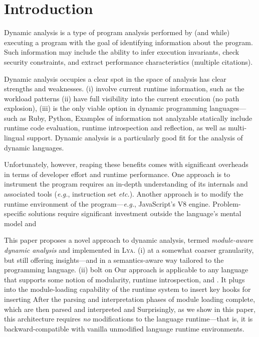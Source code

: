 \documentclass[letterpaper,twocolumn,10pt]{article}
\def\eg{{\em e.g.}, }
\def\etc{{\em etc.}\xspace}
\newcommand{\sys}{{\scshape Lya}\xspace}
\begin{document}
\section{Introduction}
\label{intro}

Dynamic analysis is a type of program analysis performed by (and while) executing a program with the goal of identifying information about the program.
Such information may include the ability to infer execution invariants, check security constraints, and extract performance characteristics (multiple citations).

Dynamic analysis occupies a clear spot in the space of analysis has clear strengths and weaknesses.
  (i) involve current runtime information, such as the workload patterns
  (ii) have full visibility into the current execution (no path explosion),
  (iii) is the only viable option in dynamic programming languages---such as Ruby, Python, 
Examples of information not analyzable statically include runtime code evaluation, runtime introspection and reflection, as well as multi-lingual support.
Dynamic analysis is a particularly good fit for the analysis of dynamic languages.

Unfortunately, however, reaping these benefits comes with significant overheads in terms of developer effort and runtime performance.
One approach is to instrument the program requires an in-depth understanding of its internals and associated tools (\eg instruction set \etc).
Another approach is to modify the runtime environment of the program---\eg JavaScript's V8 engine.
Problem-specific solutions require significant investment outside the language's mental model and  

This paper proposes a novel approach to dynamic analysis, termed \emph{module-aware dynamic analysis} and implemented in \sys.
(i) at a somewhat coarser granularity, but still offering insights---and in a semantics-aware way tailored to the programming language.
(ii) bolt on
Our approach is applicable to any language that supports some notion of modularity, runtime introspection, and .
It plugs into the module-loading capability of the runtime system to insert key hooks for inserting 
After the parsing and interpretation phases of module loading complete, 
 which are then parsed and interpreted and 
Surprisingly, as we show in this paper, this architecture requires \emph{no} modifications to the language runtime---that is, it is backward-compatible with vanilla unmodified language runtime environments.
\end{document}
